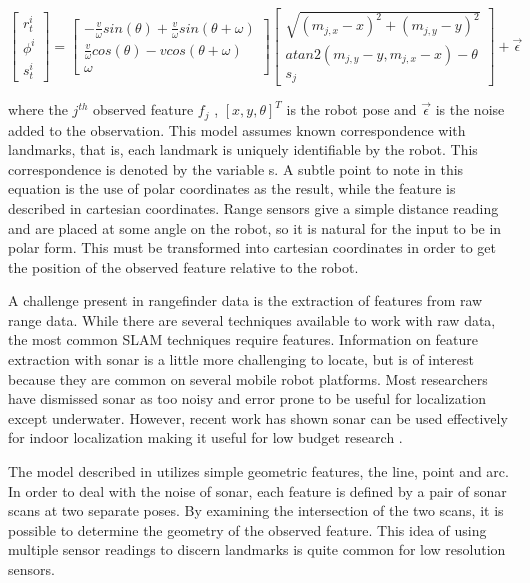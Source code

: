\documentclass[12pt]{article}
\begin{document}
\begin{equation}\label{motion_model}
\left[ {\begin{array}{cc}
 r_{t}^{i} \\
 \phi^{i} \\
 s_{t}^{i}
\end{array} } \right] =
\left[ {\begin{array}{cc}
 -\frac{v}{\omega} sin(\theta)+\frac{v}{\omega} sin(\theta + \omega) \\
 \frac{v}{\omega} cos(\theta)-v cos(\theta + \omega)  \\
\omega
\end{array} } \right] 
\left[ {\begin{array}{cc}
\sqrt{(m_{j,x}-x)^2+(m_{j,y}-y)^2} \\
atan2(m_{j,y}-y,m_{j,x}-x)-\theta \\
s_j
\end{array} } \right] 
+ \vec{\epsilon}
\end{equation}

where the $j^{th}$ observed feature $f_j$ , $[x,y,\theta ]^T$ is the robot pose and $\vec{\epsilon}$ is the noise added to the observation.  This model assumes known correspondence with landmarks, that is, each landmark is uniquely identifiable by the robot.  This correspondence is denoted by the variable s.  A subtle point to note in this equation is the use of polar coordinates as the result, while the feature is described in cartesian coordinates.  Range sensors give a simple distance reading and are placed at some angle on the robot, so it is natural for the input to be in polar form.  This must be transformed into cartesian coordinates in order to get the position of the observed feature relative to the robot.  

A challenge present in rangefinder data is the extraction of features from raw range data. While there are several techniques available to work with raw data, the most common SLAM techniques require features.  Information on feature extraction with sonar is a little more challenging to locate, but is of interest because they are common on several mobile robot platforms.  Most researchers have dismissed sonar as too noisy and error prone to be useful for localization except underwater.  However, recent work has shown sonar can be used effectively for indoor localization making it useful for low budget research \cite{lee2007feature}.  

The model described in \cite{lee2007feature} utilizes simple geometric features, the line, point and arc.  In order to deal with the noise of sonar, each feature is defined by a pair of sonar scans at two separate poses.  By examining the intersection of the two scans, it is possible to determine the geometry of the observed feature.  This idea of using multiple sensor readings to discern landmarks is quite common for low resolution sensors.
\end{document}
